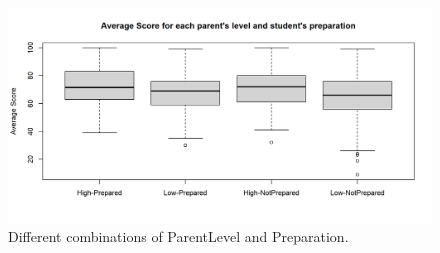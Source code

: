 \documentclass[a4paper]{article}
\begin{document}
\begin{figure}[H]
    \centering
    \includegraphics[width = 1.1\linewidth]{Images/Activity2/19.png}
    \caption{Different combinations of ParentLevel and Preparation.}
    \label{fig:trans6}
\end{figure}

\end{document}
